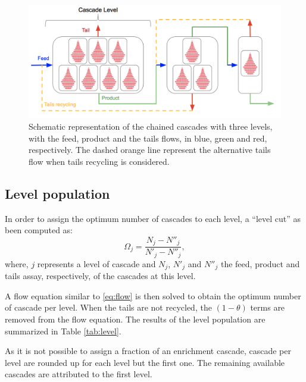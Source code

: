 \begin{figure}[ht] %
    \centering
    \includegraphics[scale=0.45]{flow}
    \caption{Schematic representation of the chained cascades with three levels,
    with the feed, product and the tails flows, in blue, green and red,
    respectively. The dashed orange line represent the alternative tails flow when
    tails recycling is considered.}
    \label{fig:cascade_level}
\end{figure}


\subsection{Level population}
In order to assign the optimum number of cascades to each level, a ``level cut'' as
been computed as:
\begin{equation}
    \Omega_{j} = \frac{N_{j}-N''_{j}}{N'_{j}-N''_{j}},
\end{equation}
where, $j$ represents a level of cascade and $N_{j}$, $N'_{j}$ and $N''_{j}$
the feed, product and tails assay, respectively, of the cascades at this level.

A flow equation similar to \eqref{eq:flow} is then solved to obtain the optimum
number of cascade per level. When the tails are not recycled, the $(1-\theta)$
terms are removed from the flow equation.  The results of the level population
are summarized in Table \ref{tab:level}.

As it is not possible to assign a fraction of an enrichment cascade, cascade per
level are rounded up for each level but the first one. The remaining available
cascades are attributed to the first level.



